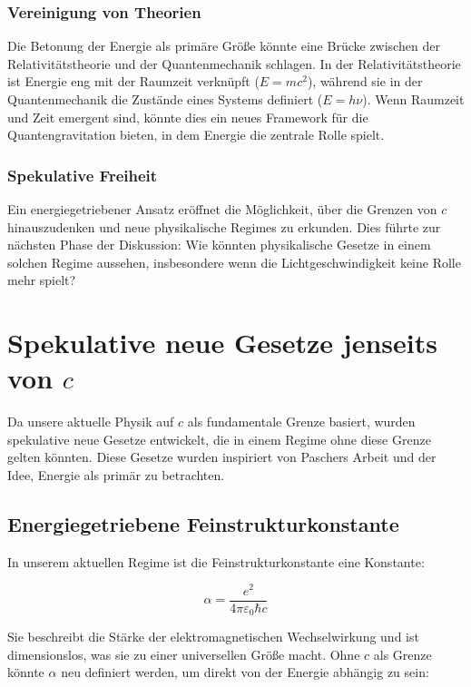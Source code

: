 \documentclass{article}
\begin{document}
	\subsubsection{Vereinigung von Theorien}
	
	Die Betonung der Energie als primäre Größe könnte eine Brücke zwischen der Relativitätstheorie und der Quantenmechanik schlagen. In der Relativitätstheorie ist Energie eng mit der Raumzeit verknüpft (\( E = mc^2 \)), während sie in der Quantenmechanik die Zustände eines Systems definiert (\( E = h\nu \)). Wenn Raumzeit und Zeit emergent sind, könnte dies ein neues Framework für die Quantengravitation bieten, in dem Energie die zentrale Rolle spielt.
	
	\subsubsection{Spekulative Freiheit}
	
	Ein energiegetriebener Ansatz eröffnet die Möglichkeit, über die Grenzen von \( c \) hinauszudenken und neue physikalische Regimes zu erkunden. Dies führte zur nächsten Phase der Diskussion: Wie könnten physikalische Gesetze in einem solchen Regime aussehen, insbesondere wenn die Lichtgeschwindigkeit keine Rolle mehr spielt?
	
	\section{Spekulative neue Gesetze jenseits von \( c \)}
	
	Da unsere aktuelle Physik auf \( c \) als fundamentale Grenze basiert, wurden spekulative neue Gesetze entwickelt, die in einem Regime ohne diese Grenze gelten könnten. Diese Gesetze wurden inspiriert von Paschers Arbeit und der Idee, Energie als primär zu betrachten.
	
	\subsection{Energiegetriebene Feinstrukturkonstante}
	
	In unserem aktuellen Regime ist die Feinstrukturkonstante eine Konstante:
	
	\[
	\alpha = \frac{e^2}{4\pi \varepsilon_0 \hbar c}
	\]
	
	Sie beschreibt die Stärke der elektromagnetischen Wechselwirkung und ist dimensionslos, was sie zu einer universellen Größe macht. Ohne \( c \) als Grenze könnte \( \alpha \) neu definiert werden, um direkt von der Energie abhängig zu sein:
	
\end{document}
